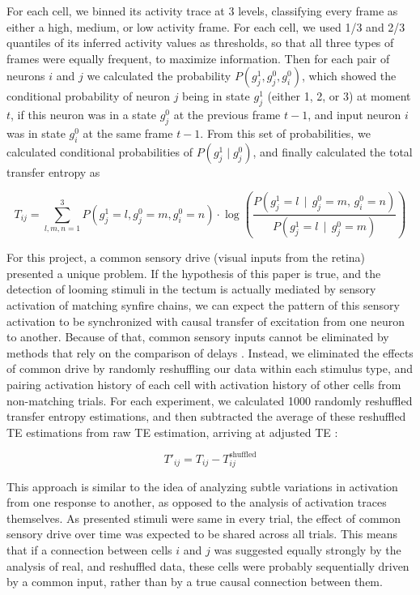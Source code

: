 \documentclass{article}
\begin{document}
For each cell, we binned its activity trace at 3 levels, classifying every frame as either a high, medium, or low activity frame. For each cell, we used 1/3 and 2/3 quantiles of its inferred activity values as thresholds, so that all three types of frames were equally frequent, to maximize information. Then for each pair of neurons $i$ and $j$ we calculated the probability $P(g_j^1,g_j^0,g_i^0)$, which showed the conditional probability of neuron $j$ being in state $g_j^1$ (either 1, 2, or 3) at moment $t$, if this neuron was in a state $g_j^0$ at the previous frame $t-1$, and  input neuron $i$ was in state $g_i^0$ at the same frame $t-1$. From this set of probabilities, we calculated conditional probabilities of $P(g_j^1 \mid g_j^0)$, and finally calculated the total transfer entropy as

\[ T_{ij} = \sum_{l,m,n=1}^3{P(g_j^1=l,g_j^0=m,g_i^0=n)}\cdot \log\left(\frac{P(g_j^1=l \, \mid \, g_j^0=m, \, g_i^0=n)}{P(g_j^1=l \, \mid \, g_j^0=m)}\right) \]

For this project, a common sensory drive (visual inputs from the retina) presented a unique problem. If the hypothesis of this paper is true, and the detection of looming stimuli in the tectum is actually mediated by sensory activation of matching synfire chains, we can expect the pattern of this sensory activation to be synchronized with causal transfer of excitation from one neuron to another. Because of that, common sensory inputs cannot be eliminated by methods that rely on the comparison of delays \citep{wollstadt2014te}. Instead, we eliminated the effects of common drive by randomly reshuffling our data within each stimulus type, and pairing activation history of each cell with activation history of other cells from non-matching trials. For each experiment, we calculated 1000 randomly reshuffled transfer entropy estimations, and then subtracted the average of these reshuffled TE estimations from raw TE estimation, arriving at adjusted TE \citep{gourevitch2007te}:

\[ T'_{ij} = T_{ij} - T^\text{shuffled}_{ij} \]

This approach is similar to the idea of analyzing subtle variations in activation from one response to another, as opposed to the analysis of activation traces themselves. As presented stimuli were same in every trial, the effect of common sensory drive over time was expected to be shared across all trials. This means that if a connection between cells $i$ and $j$ was suggested equally strongly by the analysis of real, and reshuffled data, these cells were probably sequentially driven by a common input, rather than by a true causal connection between them.
\end{document}
